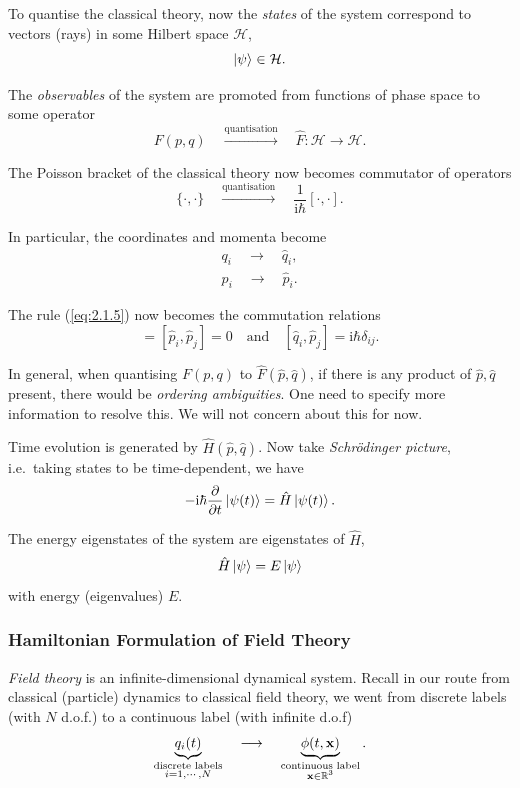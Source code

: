 \documentclass[a4paper,11pt]{article}
\begin{document}
	To quantise the classical theory, now the \emph{states} of the system correspond to vectors (rays) in some Hilbert space $\mathcal{H}$,
	\[
		\ket{\psi}\in \mathcal{H}.
	\]
	
	The \emph{observables} of the system are promoted from functions of phase space to some operator
	\[
		F(p,q) \quad \xrightarrow{\text{quantisation}} \quad \hat{F}: \mathcal{H} \to \mathcal{H}.
	\]

	The Poisson bracket of the classical theory now becomes commutator of operators
	\[
		\{\cdot,\cdot\} \quad \xrightarrow{\text{quantisation}} \quad \frac{1}{\mathrm{i} \hbar} [\cdot, \cdot].
	\]
	
	In particular, the coordinates and momenta become
	\begin{align*}
		q_i \quad \to \quad \hat{q}_i,\\
		p_i \quad \to \quad \hat{p}_i.
	\end{align*}
	
	The rule (\ref{eq:2.1.5}) now becomes the commutation relations
	\begin{equation}
		[\hat{q}_i, \hat{q}_j] = [\hat{p}_i, \hat{p}_j] = 0 \quad \text{and} \quad [\hat{q}_i, \hat{p}_j] = \mathrm{i} \hbar \delta _{ij}.
		\label{eq:2.1.6}
	\end{equation}

	\begin{nt}
		In general, when quantising $F(p,q)$ to $\hat{F}(\hat p, \hat q)$, if there is any product of $\hat p, \hat q$ present, there would be \emph{ordering ambiguities}. One need to specify more information to resolve this. We will not concern about this for now.
	\end{nt}

	Time evolution is generated by $\hat H(\hat p, \hat q)$. Now take \emph{Schr\"odinger picture}, i.e.\ taking states to be time-dependent, we have
	\[
		- \mathrm{i} \hbar \pdv{t} \ket{\psi(t)} = \hat H \ket{\psi(t)}.
	\]
	
	The energy eigenstates of the system are eigenstates of $\hat H$,
	\[
		\hat H \ket{\psi} = E \ket{\psi}
	\]
	with energy (eigenvalues) $E$.
	
	\subsubsection{Hamiltonian Formulation of Field Theory}

	\emph{Field theory} is an infinite-dimensional dynamical system. Recall in our route from classical (particle) dynamics to classical field theory, we went from discrete labels (with $N$ d.o.f.) to a continuous label (with infinite d.o.f)
	\[
		\underbrace{q_i(t)}_{\substack{\text{discrete labels}\\i = 1,\cdots,N}} \quad \longrightarrow \quad \underbrace{\phi(t, \vb x)}_{\substack{\text{continuous label}\\\vb x \in \mathbb{R}^3}}.
	\]
\end{document}
